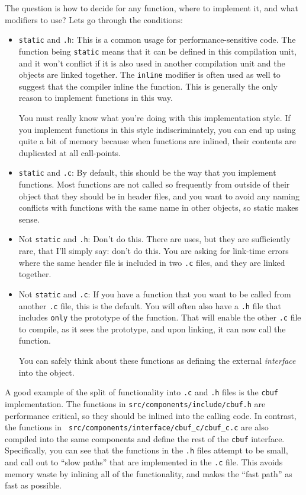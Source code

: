 \documentclass[11pt,onecolumn]{article}
\newcommand{\head}[1]{\vspace{0.4em}\noindent{\bf #1}}
\begin{document}
The question is how to decide for any function, where to implement it,
and what modifiers to use?  Lets go through the conditions:
\begin{itemize}[itemsep=0pt,topsep=1pt,parsep=1pt,leftmargin=2.5em]
\item {\tt static} and {\tt *.h}: This is a common usage for
  performance-sensitive code.  The function being {\tt static} means
  that it can be defined in this compilation unit, and it won't
  conflict if it is also used in another compilation unit and the
  objects are linked together.  The {\tt inline} modifier is often
  used as well to suggest that the compiler inline the function.  This
  is generally the only reason to implement functions in this way.

  You must really know what you're doing with this implementation
  style.  If you implement functions in this style indiscriminately,
  you can end up using quite a bit of memory because when functions
  are inlined, their contents are duplicated at all call-points. 
\item {\tt static} and {\tt *.c}: By default, this should be the way
  that you implement functions.  Most functions are not called so
  frequently from outside of their object that they should be in
  header files, and you want to avoid any naming conflicts with
  functions with the same name in other objects, so static makes
  sense.
\item Not {\tt static} and {\tt *.h}: Don't do this.  There are uses,
  but they are sufficiently rare, that I'll simply say: don't do this.
  You are asking for link-time errors where the same header file is
  included in two {\tt *.c} files, and they are linked together.
\item Not {\tt static} and {\tt *.c}: If you have a function that you
  want to be called from another {\tt *.c} file, this is the default.
  You will often also have a {\tt *.h} file that includes {\tt only}
  the prototype of the function.  That will enable the other {\tt *.c}
  file to compile, as it sees the prototype, and upon linking, it can
  now call the function.

  You can safely think about these functions as defining the external
  {\em interface} into the object.
\end{itemize}

\head{Example.}  A good example of the split of functionality into
     {\tt .c} and {\tt .h} files is the {\tt cbuf} implementation.
     The functions in {\tt src/components/include/cbuf.h} are
     performance critical, so they should be inlined into the calling
     code.  In contrast, the functions in {\tt
       src/components/interface/cbuf_c/cbuf_c.c} are also compiled
     into the same components and define the rest of the {\tt cbuf}
     interface.  Specifically, you can see that the functions in the
     {\tt .h} files attempt to be small, and call out to ``slow
     paths'' that are implemented in the {\tt .c} file.  This avoids
     memory waste by inlining all of the functionality, and makes the
     ``fast path'' as fast as possible.
\end{document}
